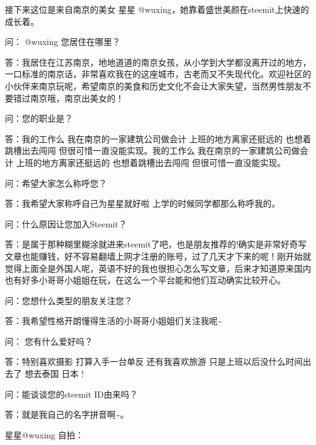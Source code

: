 \documentclass[]{ctexbook}
\begin{document}
接下来这位是来自南京的美女 星星 @wuxing，她靠着盛世美颜在steemit上快速的成长着。

问： @wuxing 您居住在哪里？

答：我居住在江苏南京，地地道道的南京女孩，从小学到大学都没离开过的地方，一口标准的南京话，非常喜欢我在的这座城市，古老而又不失现代化。欢迎社区的小伙伴来南京玩呢，希望南京的美食和历史文化不会让大家失望，当然男性朋友不要错过南京哦，南京出美女的！

问：您的职业是？

答：我的工作么 我在南京的一家建筑公司做会计 上班的地方离家还挺远的 也想着跳槽出去闯闯 但很可惜一直没能实现。我的工作么 我在南京的一家建筑公司做会计 上班的地方离家还挺远的 也想着跳槽出去闯闯 但很可惜一直没能实现。

问：希望大家怎么称呼您？

答：我希望大家称呼自己为星星就好啦 上学的时候同学都那么称呼我的。

问：什么原因让您加入Steemit？

答：是属于那种糊里糊涂就进来steemit了吧，也是朋友推荐的!确实是非常好奇写文章也能赚钱，好不容易翻墙上网才注册的账号，过了几天才下来的呢！刚开始就觉得上面全是外国人呢，英语不好的我也很担心怎么写文章，后来才知道原来国内也有好多小哥哥小姐姐在玩，在这么一个平台能和他们互动确实比较开心。

问：您想什么类型的朋友关注您？

答：我希望性格开朗懂得生活的小哥哥小姐姐们关注我呢\textasciitilde{}

问： 您有什么爱好吗？

答：特别喜欢摄影 打算入手一台单反 还有我喜欢旅游 只是上班以后没什么时间出去了 想去泰国 日本 !

问：能谈谈您的steemit ID由来吗？

答：就是我自己的名字拼音啊\textasciitilde{}。

星星@wuxing 自拍：
\end{document}

